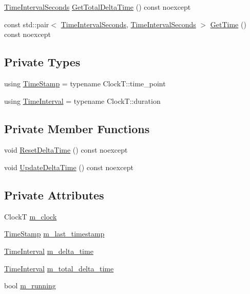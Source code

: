 \begin{DoxyCompactItemize}
\item 
\mbox{\hyperlink{namespacemage_a21c3d1575018d1e0720948713c76be1f}{Time\+Interval\+Seconds}} \mbox{\hyperlink{classmage_1_1_timer_aece10085e326df9110d9f84d74fd2558}{Get\+Total\+Delta\+Time}} () const noexcept
\item 
const std\+::pair$<$ \mbox{\hyperlink{namespacemage_a21c3d1575018d1e0720948713c76be1f}{Time\+Interval\+Seconds}}, \mbox{\hyperlink{namespacemage_a21c3d1575018d1e0720948713c76be1f}{Time\+Interval\+Seconds}} $>$ \mbox{\hyperlink{classmage_1_1_timer_a7e04c39e6baaf9dcebe4eea1708cfd55}{Get\+Time}} () const noexcept
\end{DoxyCompactItemize}
\subsection*{Private Types}
\begin{DoxyCompactItemize}
\item 
using \mbox{\hyperlink{classmage_1_1_timer_abd11aea6107940b09ef3c48f62c81668}{Time\+Stamp}} = typename Clock\+T\+::time\+\_\+point
\item 
using \mbox{\hyperlink{classmage_1_1_timer_a5c0fd78ceab0110637622bd0e9b8424d}{Time\+Interval}} = typename Clock\+T\+::duration
\end{DoxyCompactItemize}
\subsection*{Private Member Functions}
\begin{DoxyCompactItemize}
\item 
void \mbox{\hyperlink{classmage_1_1_timer_ac39577316a032bce5b009401d67d406b}{Reset\+Delta\+Time}} () const noexcept
\item 
void \mbox{\hyperlink{classmage_1_1_timer_a05cbba0b368e49cdf4bfebfd840e4118}{Update\+Delta\+Time}} () const noexcept
\end{DoxyCompactItemize}
\subsection*{Private Attributes}
\begin{DoxyCompactItemize}
\item 
ClockT \mbox{\hyperlink{classmage_1_1_timer_ad46016090f9ae8a282398d8fcc8e9e0e}{m\+\_\+clock}}
\item 
\mbox{\hyperlink{classmage_1_1_timer_abd11aea6107940b09ef3c48f62c81668}{Time\+Stamp}} \mbox{\hyperlink{classmage_1_1_timer_a01e35b71a5fe5eebe3b05c1b675cb5ce}{m\+\_\+last\+\_\+timestamp}}
\item 
\mbox{\hyperlink{classmage_1_1_timer_a5c0fd78ceab0110637622bd0e9b8424d}{Time\+Interval}} \mbox{\hyperlink{classmage_1_1_timer_a9cb9bf6cd0f567a8a1fad02a89d98aa2}{m\+\_\+delta\+\_\+time}}
\item 
\mbox{\hyperlink{classmage_1_1_timer_a5c0fd78ceab0110637622bd0e9b8424d}{Time\+Interval}} \mbox{\hyperlink{classmage_1_1_timer_aa62b280ee2b58a3f75440cc4faf10b23}{m\+\_\+total\+\_\+delta\+\_\+time}}
\item 
bool \mbox{\hyperlink{classmage_1_1_timer_a195789c583eb8bd3b9f0058214b74bc5}{m\+\_\+running}}
\end{DoxyCompactItemize}



